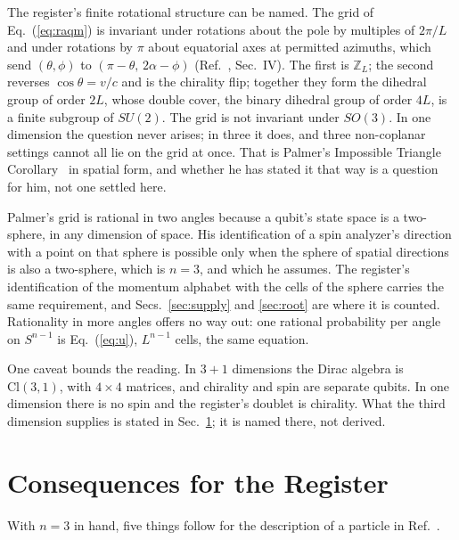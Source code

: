 \documentclass[aps,prd,twocolumn,superscriptaddress,nofootinbib]{revtex4-2}
\begin{document}
The register's finite rotational structure can be named. The grid of Eq.~(\ref{eq:raqm}) is invariant under rotations about the pole by multiples of $2\pi/L$ and under rotations by $\pi$ about equatorial axes at permitted azimuths, which send $(\theta,\phi)$ to $(\pi-\theta,\,2\alpha-\phi)$ (Ref.~\cite{korytko2026c}, Sec.~IV). The first is $\mathbb{Z}_L$; the second reverses $\cos\theta = v/c$ and is the chirality flip; together they form the dihedral group of order $2L$, whose double cover, the binary dihedral group of order $4L$, is a finite subgroup of $SU(2)$. The grid is not invariant under $SO(3)$. In one dimension the question never arises; in three it does, and three non-coplanar settings cannot all lie on the grid at once. That is Palmer's Impossible Triangle Corollary~\cite{palmer2026b,palmer2026c} in spatial form, and whether he has stated it that way is a question for him, not one settled here.

Palmer's grid is rational in two angles because a qubit's state space is a two-sphere, in any dimension of space. His identification of a spin analyzer's direction with a point on that sphere is possible only when the sphere of spatial directions is also a two-sphere, which is $n = 3$, and which he assumes. The register's identification of the momentum alphabet with the cells of the sphere carries the same requirement, and Secs.~\ref{sec:supply} and \ref{sec:root} are where it is counted. Rationality in more angles offers no way out: one rational probability per angle on $S^{n-1}$ is Eq.~(\ref{eq:u}), $L^{n-1}$ cells, the same equation.

One caveat bounds the reading. In $3+1$ dimensions the Dirac algebra is $\mathrm{Cl}(3,1)$, with $4\times4$ matrices, and chirality and spin are separate qubits. In one dimension there is no spin and the register's doublet is chirality. What the third dimension supplies is stated in Sec.~\ref{sec:consequences}; it is named there, not derived.

\section{Consequences for the Register}
\label{sec:consequences}

With $n = 3$ in hand, five things follow for the description of a particle in Ref.~\cite{korytko2026c}.
\end{document}
